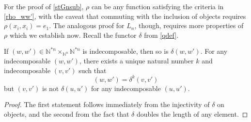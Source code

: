 \documentclass{amsbook} %
\numberwithin{section}{chapter}
\begin{document}
For the proof of \cref{stGnsub}, $\rho$ can be any function satisfying the criteria in \cref{rho_ww'}, with the caveat that commuting with the inclusion of objects requires $\rho(x_i, x_i) = e_1$. The analogous proof for $L_n$, though, requires more properties of $\rho$ which we establish now. Recall the functor $\delta$ from \cref{qdef}.

\begin{lem}\label{rho_lemmas}
If $(w,w') \in \mathbb{N}^{\ast n} \times_{\mathbb{N}^n} \mathbb{N}^{\ast n}$ is indecomposable, then so is $\delta(w,w')$. For any indecomposable $(w,w')$, there exists a unique natural number $k$ and indecomposable $(v,v')$ such that
\[
(w,w') = \delta^k(v,v')
\]
but $(v,v')$ is not $\delta(u,u')$ for any indecomposable $(u,u')$.
\end{lem}
\begin{proof}
The first statement follows immediately from the injectivity of $\delta$ on objects, and the second from the fact that $\delta$ doubles the length of any element.
\end{proof}
\end{document}

